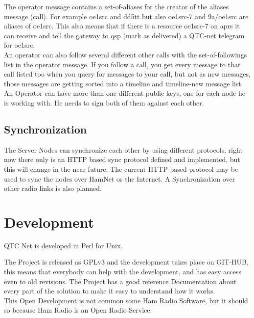 \documentclass{article}
\begin{document}
The operator message contains a set-of-aliases for the creator of the aliases 
message (call). For example oe1src and dd5tt but also oe1src-7 and 9a/oe1src 
are aliases of oe1src. This also means that if there is a resource oe1src-7 
on aprs it can receive and tell the gateway to qsp (mark as delivered) a QTC-net 
telegram for oe1src. \\

An operator can also follow several different other calls with the set-of-followings
list in the operator message.  If you follow a call, you get every message to that call 
listed  too when you query for messages to your call, but not as new messages, those 
messages are getting sorted into a timeline and timeline-new message list\\

An Operator can have more than one different public keys, one for each 
node he is working with. He needs to sign both of them against each other. \\

\subsection{Synchronization}

The Server Nodes can synchronize each other by using different protocols, right
now there only is an HTTP based sync protocol defined and implemented, but this
will change in the near future. The current HTTP based protocol may be used to 
sync the nodes over HamNet or the Internet. A Synchronization over other radio 
links is also planned.  \\

\section{Development}

QTC Net is developed in Perl for Unix.

The Project is released as GPLv3 and the development takes place on GIT-HUB,
this means that everybody can help with the development, and has easy access
even to old revisions. The Project has a good reference Documentation about
every part of the solution to make it easy to understand how it works. \\

This Open Development is not common some Ham Radio Software, but it should so 
because Ham Radio is an Open Radio Service. \\
\end{document}
